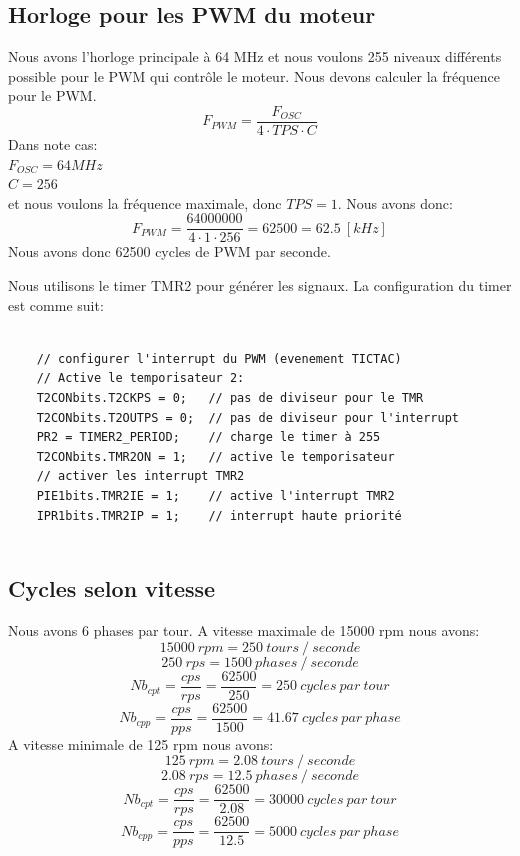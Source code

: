 \documentclass[fleqn, 11pt, a4paper]{article}
\begin{document}
  \subsection{Horloge pour les PWM du moteur}
  Nous avons l'horloge principale à 64 MHz et nous voulons 255 niveaux différents possible pour le PWM qui contrôle le moteur.
  Nous devons calculer la fréquence pour le PWM.
  $$F_{PWM} = \frac{F_{OSC}}{4 \cdot TPS \cdot C}$$
  Dans note cas:\\
  $F_{OSC} = 64 MHz$\\
  $C = 256$\\
  et nous voulons la fréquence maximale, donc $TPS = 1$.
  Nous avons donc:
  $$F_{PWM} = \frac{64000000}{4 \cdot 1 \cdot 256} = 62500 = 62.5\ [kHz]$$
  Nous avons donc 62500 cycles de PWM par seconde.
  
  Nous utilisons le timer TMR2 pour générer les signaux.
  La configuration du timer est comme suit:
  
  \begin{lstlisting}[caption=Configuration du Timer TMR2, label=lst:tmr2_config]
  
    // configurer l'interrupt du PWM (evenement TICTAC)
    // Active le temporisateur 2:
    T2CONbits.T2CKPS = 0;   // pas de diviseur pour le TMR
    T2CONbits.T2OUTPS = 0;  // pas de diviseur pour l'interrupt
    PR2 = TIMER2_PERIOD;    // charge le timer à 255
    T2CONbits.TMR2ON = 1;   // active le temporisateur
    // activer les interrupt TMR2
    PIE1bits.TMR2IE = 1;    // active l'interrupt TMR2
    IPR1bits.TMR2IP = 1;    // interrupt haute priorité
  
  \end{lstlisting}
  
  \subsection{Cycles selon vitesse}
  Nous avons 6 phases par tour.
  A vitesse maximale de 15000 rpm nous avons:
  $$15000 \ rpm = 250\ tours\ /\ seconde$$
  $$ 250 \ rps = 1500\ phases\ /\ seconde$$
  $$Nb_{cpt} = \frac{cps}{rps} = \frac{62500}{250} = 250\ cycles\ par\ tour$$
  $$Nb_{cpp} = \frac{cps}{pps} = \frac{62500}{1500} = 41.67\ cycles\ par\ phase$$
  A vitesse minimale de 125 rpm nous avons:
  $$125 \ rpm = 2.08\ tours\ /\ seconde$$
  $$ 2.08 \ rps = 12.5\ phases\ /\ seconde$$
  $$Nb_{cpt} = \frac{cps}{rps} = \frac{62500}{2.08} = 30000\ cycles\ par\ tour$$
  $$Nb_{cpp} = \frac{cps}{pps} = \frac{62500}{12.5} = 5000\ cycles\ par\ phase$$
  
\end{document}
